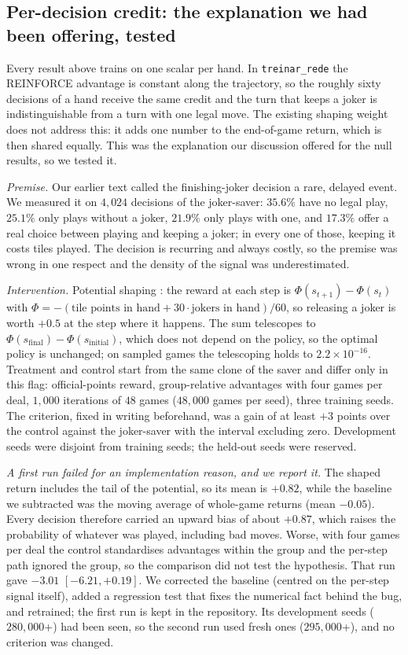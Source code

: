 \documentclass[11pt]{article}
\begin{document}
\subsection{Per-decision credit: the explanation we had been offering, tested}\label{sec:passo}
Every result above trains on one scalar per hand. In \texttt{treinar\_rede} the REINFORCE advantage is constant along the trajectory, so the roughly sixty decisions of a hand receive the same credit and the turn that keeps a joker is indistinguishable from a turn with one legal move. The existing shaping weight does not address this: it adds one number to the end-of-game return, which is then shared equally. This was the explanation our discussion offered for the null results, so we tested it.

\emph{Premise.} Our earlier text called the finishing-joker decision a rare, delayed event. We measured it on $4{,}024$ decisions of the joker-saver: $35.6\%$ have no legal play, $25.1\%$ only plays without a joker, $21.9\%$ only plays with one, and $17.3\%$ offer a real choice between playing and keeping a joker; in every one of those, keeping it costs tiles played. The decision is recurring and always costly, so the premise was wrong in one respect and the density of the signal was underestimated.

\emph{Intervention.} Potential shaping \cite{ng1999}: the reward at each step is $\Phi(s_{t+1})-\Phi(s_t)$ with $\Phi=-(\text{tile points in hand}+30\cdot\text{jokers in hand})/60$, so releasing a joker is worth $+0.5$ at the step where it happens. The sum telescopes to $\Phi(s_{\text{final}})-\Phi(s_{\text{initial}})$, which does not depend on the policy, so the optimal policy is unchanged; on sampled games the telescoping holds to $2.2\times10^{-16}$. Treatment and control start from the same clone of the saver and differ only in this flag: official-points reward, group-relative advantages with four games per deal, $1{,}000$ iterations of $48$ games ($48{,}000$ games per seed), three training seeds. The criterion, fixed in writing beforehand, was a gain of at least $+3$ points over the control against the joker-saver with the interval excluding zero. Development seeds were disjoint from training seeds; the held-out seeds were reserved.

\emph{A first run failed for an implementation reason, and we report it.} The shaped return includes the tail of the potential, so its mean is $+0.82$, while the baseline we subtracted was the moving average of whole-game returns (mean $-0.05$). Every decision therefore carried an upward bias of about $+0.87$, which raises the probability of whatever was played, including bad moves. Worse, with four games per deal the control standardises advantages within the group and the per-step path ignored the group, so the comparison did not test the hypothesis. That run gave $-3.01$ $[-6.21,+0.19]$. We corrected the baseline (centred on the per-step signal itself), added a regression test that fixes the numerical fact behind the bug, and retrained; the first run is kept in the repository. Its development seeds ($280{,}000$+) had been seen, so the second run used fresh ones ($295{,}000$+), and no criterion was changed.
\end{document}

